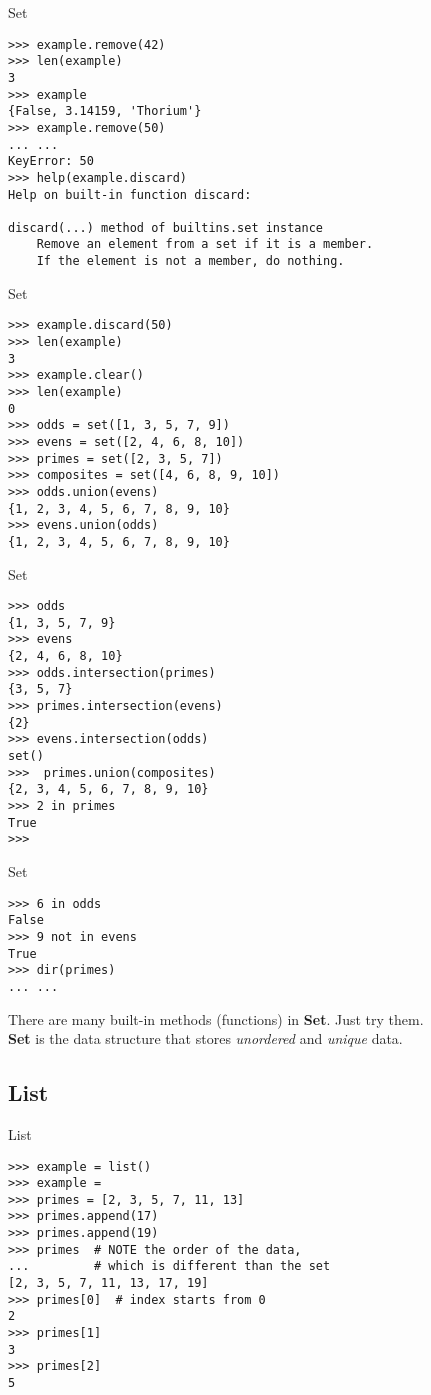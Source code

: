 \documentclass{beamer}
\begin{document}
\begin{frame}[fragile]{Set}
\begin{verbatim}
>>> example.remove(42)
>>> len(example)
3
>>> example
{False, 3.14159, 'Thorium'}
>>> example.remove(50)
... ...
KeyError: 50
>>> help(example.discard)
Help on built-in function discard:

discard(...) method of builtins.set instance
    Remove an element from a set if it is a member.
    If the element is not a member, do nothing.
\end{verbatim}
\end{frame}

\begin{frame}[fragile]{Set}
\begin{verbatim}
>>> example.discard(50)
>>> len(example)
3
>>> example.clear()
>>> len(example)
0
>>> odds = set([1, 3, 5, 7, 9])
>>> evens = set([2, 4, 6, 8, 10])
>>> primes = set([2, 3, 5, 7])
>>> composites = set([4, 6, 8, 9, 10])
>>> odds.union(evens)
{1, 2, 3, 4, 5, 6, 7, 8, 9, 10}
>>> evens.union(odds)
{1, 2, 3, 4, 5, 6, 7, 8, 9, 10}
\end{verbatim}
\end{frame}

\begin{frame}[fragile]{Set}
\begin{verbatim}
>>> odds
{1, 3, 5, 7, 9}
>>> evens
{2, 4, 6, 8, 10}
>>> odds.intersection(primes)
{3, 5, 7}
>>> primes.intersection(evens)
{2}
>>> evens.intersection(odds)
set()
>>>  primes.union(composites)
{2, 3, 4, 5, 6, 7, 8, 9, 10}
>>> 2 in primes
True
>>>
\end{verbatim}
\end{frame}

\begin{frame}[fragile]{Set}
\begin{verbatim}
>>> 6 in odds
False
>>> 9 not in evens
True
>>> dir(primes)
... ...
\end{verbatim}

There are many built-in methods (functions) in \textbf{Set}. Just try them.\\
\textbf{Set} is the data structure that stores \textit{unordered} and \textit{unique} data.
\end{frame}

\subsection{List}

\begin{frame}[fragile]{List}
\begin{verbatim}
>>> example = list()
>>> example = 
>>> primes = [2, 3, 5, 7, 11, 13]
>>> primes.append(17)
>>> primes.append(19)
>>> primes  # NOTE the order of the data, 
...         # which is different than the set
[2, 3, 5, 7, 11, 13, 17, 19]
>>> primes[0]  # index starts from 0
2
>>> primes[1]
3
>>> primes[2]
5
\end{verbatim}
\end{frame}
\end{document}
